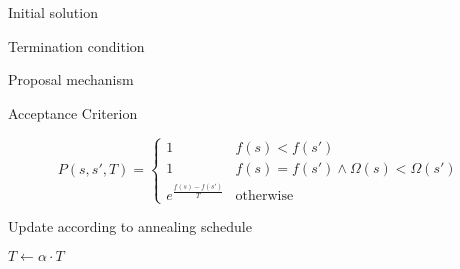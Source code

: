\begin{homeworkProblem}
\begin{algorithm}
\begin{algorithmic}
\EndProcedure
\end{algorithmic}
\end{algorithm}

\begin{algorithm}
\caption{Initial solution}
\label{SA:Init}
\begin{algorithmic}
\EndProcedure    
\end{algorithmic}
\end{algorithm}

\begin{algorithm}
\caption{Termination condition}
\label{SA.Term}
\begin{algorithmic}
\EndProcedure
\end{algorithmic}
\end{algorithm}

\begin{algorithm}
\caption{Proposal mechanism}
\label{SA:Prop}
\begin{algorithmic}
\EndProcedure
\end{algorithmic}
\end{algorithm}

\begin{algorithm}
\caption{Acceptance Criterion}
\label{saTSPTW}
\begin{algorithmic}
\EndProcedure
\end{algorithmic}
\end{algorithm}

\begin{equation}
  P(s,s',T) = \begin{cases}
               1 & f(s) < f(s') \\
               1 & f(s) = f(s') \wedge \Omega(s) < \Omega(s')\\
               e^{\frac{f(s)-f(s')}{T}} & \text{otherwise}
              \end{cases}
\end{equation}

\begin{algorithm}
\caption{Update according to annealing schedule}
\label{saTSPTW}
\begin{algorithmic}
  \State $T \gets \alpha \cdot T$
\EndProcedure
\end{algorithmic}
\end{algorithm}




\end{homeworkProblem}
